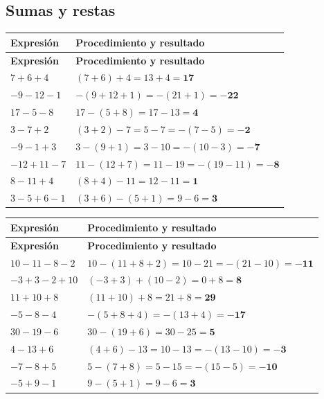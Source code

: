 \documentclass[spanish,letterpaper,oneside]{article}
\begin{document}
\subsection*{Sumas y restas}


{\small{}\renewcommand{\arraystretch}{1.28}
\begin{longtable}{|>{\raggedright\arraybackslash}p{}|>{\raggedright\arraybackslash}p{}|}\hline
\rowcolor{iiiepePale} \textbf{Expresión} & \textbf{Procedimiento y resultado} \\\hline
\endfirsthead
\hline
\rowcolor{iiiepePale} \textbf{Expresión} & \textbf{Procedimiento y resultado} \\\hline
\endhead
$7+6+4$ & $(7+6)+4 = 13+4 = \mathbf{17}$ \\\hline
$-9-12-1$ & $-(9+12+1) = -(21+1) = \mathbf{-22}$ \\\hline
$17-5-8$ & $17-(5+8) = 17-13 = \mathbf{4}$ \\\hline
$3-7+2$ & $(3+2)-7 = 5-7 = -(7-5) = \mathbf{-2}$ \\\hline
$-9-1+3$ & $3-(9+1) = 3-10 = -(10-3) = \mathbf{-7}$ \\\hline
$-12+11-7$ & $11-(12+7) = 11-19 = -(19-11) = \mathbf{-8}$ \\\hline
$8-11+4$ & $(8+4)-11 = 12-11 = \mathbf{1}$ \\\hline
$3-5+6-1$ & $(3+6)-(5+1) = 9-6 = \mathbf{3}$ \\\hline
\end{longtable}}



{\small{}\renewcommand{\arraystretch}{1.28}
\begin{longtable}{|>{\raggedright\arraybackslash}p{}|>{\raggedright\arraybackslash}p{}|}\hline
\rowcolor{iiiepePale} \textbf{Expresión} & \textbf{Procedimiento y resultado} \\\hline
\endfirsthead
\hline
\rowcolor{iiiepePale} \textbf{Expresión} & \textbf{Procedimiento y resultado} \\\hline
\endhead
$10-11-8-2$ & $10-(11+8+2) = 10-21 = -(21-10) = \mathbf{-11}$ \\\hline
$-3+3-2+10$ & $(-3+3)+(10-2) = 0+8 = \mathbf{8}$ \\\hline
$11+10+8$ & $(11+10)+8 = 21+8 = \mathbf{29}$ \\\hline
$-5-8-4$ & $-(5+8+4) = -(13+4) = \mathbf{-17}$ \\\hline
$30-19-6$ & $30-(19+6) = 30-25 = \mathbf{5}$ \\\hline
$4-13+6$ & $(4+6)-13 = 10-13 = -(13-10) = \mathbf{-3}$ \\\hline
$-7-8+5$ & $5-(7+8) = 5-15 = -(15-5) = \mathbf{-10}$ \\\hline
$-5+9-1$ & $9-(5+1) = 9-6 = \mathbf{3}$ \\\hline
\end{longtable}}
\end{document}
